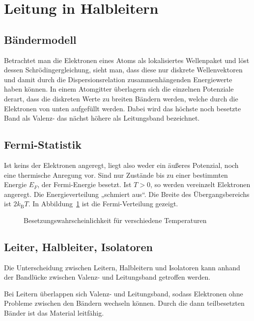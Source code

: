 \section{Leitung in Halbleitern}

\subsection{Bändermodell}

Betrachtet man die Elektronen eines Atoms als lokalisiertes Wellenpaket und
löst dessen Schrödingergleichung, sieht man, dass diese nur diskrete
Wellenvektoren und damit durch die Dispersionsrelation zusammenhängenden
Energiewerte haben können. In einem Atomgitter überlagern sich die einzelnen
Potenziale derart, dass die diskreten Werte zu breiten Bändern werden, welche
durch die Elektronen von unten aufgefüllt werden. Dabei wird das höchste noch
besetzte Band als Valenz- das nächst höhere als Leitungsband bezeichnet.

\subsection{Fermi-Statistik}

Ist keins der Elektronen angeregt, liegt also weder ein äußeres Potenzial, noch
eine thermische Anregung vor. Sind nur Zustände bis zu einer bestimmten Energie
$E_F$, der Fermi-Energie besetzt. Ist $T>0$, so werden vereinzelt Elektronen
angeregt. Die Energieverteilung „schmiert aus“. Die Breite des
Übergangsbereichs ist $2k_\text{B}T$. In Abbildung~\ref{fig:Fermi} ist die
Fermi-Verteilung gezeigt.

\begin{figure}
    \centering
    \caption{%
        Besetzungswahrscheinlichkeit für verschiedene Temperaturen
    }
    \label{fig:Fermi}
\end{figure}

\subsection{Leiter, Halbleiter, Isolatoren}

Die Unterscheidung zwischen Leitern, Halbleitern und Isolatoren kann anhand der
Bandlücke zwischen Valenz- und Leitungsband getroffen werden.

Bei Leitern überlappen sich Valenz- und Leitungsband, sodass Elektronen ohne
Probleme zwischen den Bändern wechseln können. Durch die dann teilbesetzten Bänder ist das
Material leitfähig.

